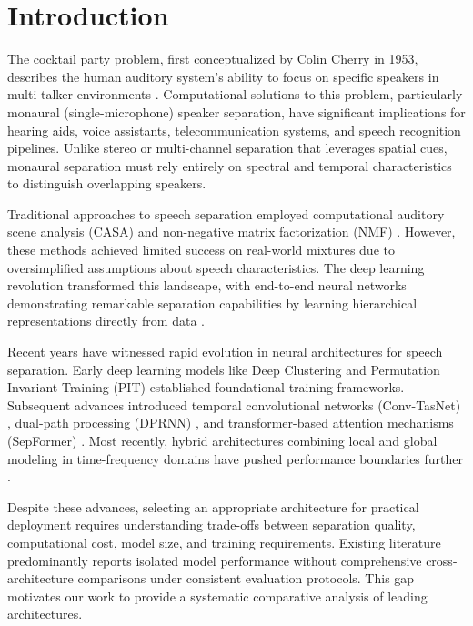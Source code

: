 \documentclass[conference]{IEEEtran}
\begin{document}
\section{Introduction}

The cocktail party problem, first conceptualized by Colin Cherry in 1953, describes the human auditory system's ability to focus on specific speakers in multi-talker environments \cite{cherry1953cocktail}. Computational solutions to this problem, particularly monaural (single-microphone) speaker separation, have significant implications for hearing aids, voice assistants, telecommunication systems, and speech recognition pipelines. Unlike stereo or multi-channel separation that leverages spatial cues, monaural separation must rely entirely on spectral and temporal characteristics to distinguish overlapping speakers.

Traditional approaches to speech separation employed computational auditory scene analysis (CASA) \cite{wang2006ideal} and non-negative matrix factorization (NMF) \cite{schmidt2006single}. However, these methods achieved limited success on real-world mixtures due to oversimplified assumptions about speech characteristics. The deep learning revolution transformed this landscape, with end-to-end neural networks demonstrating remarkable separation capabilities by learning hierarchical representations directly from data \cite{hershey2016deep}.

Recent years have witnessed rapid evolution in neural architectures for speech separation. Early deep learning models like Deep Clustering \cite{hershey2016deep} and Permutation Invariant Training (PIT) \cite{kolbaek2017multitalker} established foundational training frameworks. Subsequent advances introduced temporal convolutional networks (Conv-TasNet) \cite{luo2019conv}, dual-path processing (DPRNN) \cite{luo2020dual}, and transformer-based attention mechanisms (SepFormer) \cite{subakan2021attention}. Most recently, hybrid architectures combining local and global modeling in time-frequency domains have pushed performance boundaries further \cite{wang2023tfgridnet, zhao2024mossformer}.

Despite these advances, selecting an appropriate architecture for practical deployment requires understanding trade-offs between separation quality, computational cost, model size, and training requirements. Existing literature predominantly reports isolated model performance without comprehensive cross-architecture comparisons under consistent evaluation protocols. This gap motivates our work to provide a systematic comparative analysis of leading architectures.
\end{document}

